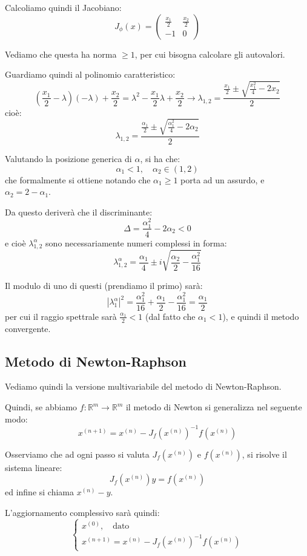 \documentclass[a4paper,11pt]{article}
\begin{document}
Calcoliamo quindi il Jacobiano:
$$
J_\phi(x) =
\begin{pmatrix}
	\frac{x_1}{2} & \frac{x_2}{2} \\
	-1 & 0
\end{pmatrix}
$$

Vediamo che questa ha norma $\geq 1$, per cui bisogna calcolare gli autovalori.

Guardiamo quindi al polinomio caratteristico:
$$
\left(\frac{x_1}{2} - \lambda\right) \left(-\lambda\right) + \frac{x_2}{2} = \lambda^2 - \frac{x_1}{2} \lambda + \frac{x_2}{2} \rightarrow \lambda_{1, 2} = \frac{\frac{x_1}{2} \pm \sqrt{\frac{x_1^2}{4} - 2 x_2}}{2}
$$
cioè:
$$
\lambda_{1, 2} = \frac{\frac{\alpha_1}{2} \pm \sqrt{\frac{\alpha_1^2}{4} - 2 \alpha_2}}{2}
$$

Valutando la posizione generica di $\alpha$, si ha che:
$$
\alpha_1 < 1, \quad \alpha_2 \in (1, 2)
$$
che formalmente si ottiene notando che $\alpha_1 \geq 1$ porta ad un assurdo, e $\alpha_2 = 2 - \alpha_1$.

Da questo deriverà che il discriminante:
$$
\Delta = \frac{\alpha_1^2}{4} - 2 \alpha_2 < 0
$$
e cioè $\lambda_{1, 2}^\alpha$ sono necessariamente numeri complessi in forma:
$$
\lambda_{1, 2}^\alpha = \frac{\alpha_1}{4} \pm i \sqrt{ \frac{\alpha_2}{2} - \frac{\alpha_1^2}{16} }
$$

Il modulo di uno di questi (prendiamo il primo) sarà:
$$
|\lambda_1^\alpha|^2 = \frac{\alpha_1^2}{16} + \frac{\alpha_1}{2} - \frac{\alpha_1^2}{16} = \frac{\alpha_1}{2}
$$
per cui il raggio spettrale sarà $\frac{\alpha_1}{2} < 1$ (dal fatto che $\alpha_1 < 1$), e quindi il metodo convergente.

\subsection{Metodo di Newton-Raphson}
Vediamo quindi la versione multivariabile del metodo di Newton-Raphson.

Quindi, se abbiamo $f : \mathbb{R}^m \rightarrow \mathbb{R}^m$ il metodo di Newton si generalizza nel seguente modo:
$$
x^{(n + 1)} = x^{(n)} - J_f (x^{(n)})^{-1} f(x^{(n)})
$$

Osserviamo che ad ogni passo si valuta $J_f(x^{(n)})$ e $f(x^{(n)})$, si risolve il sistema lineare:
$$
J_f(x^{(n)}) y = f(x^{(n)})
$$
ed infine si chiama $x^{(n)} - y$.

L'aggiornamento complessivo sarà quindi:
\[
	\begin{cases}
		x^{(0)}, \quad \text{dato} \\
		x^{(n + 1)} = x^{(n)} - J_f(x^{(n)})^{-1} f(x^{(n)})
	\end{cases}
\]
\end{document}
